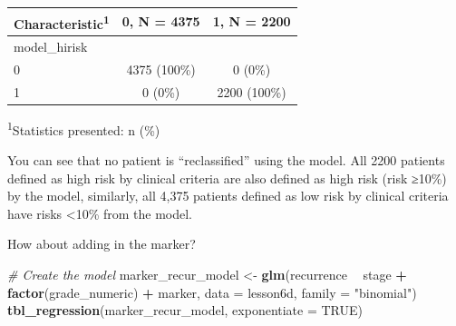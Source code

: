 \documentclass[]{book}
\newenvironment{Shaded}{\begin{snugshade}}{\end{snugshade}}
\newcommand{\CommentTok}[1]{\textcolor[rgb]{0.56,0.35,0.01}{\textit{#1}}}
\newcommand{\DataTypeTok}[1]{\textcolor[rgb]{0.13,0.29,0.53}{#1}}
\newcommand{\DecValTok}[1]{\textcolor[rgb]{0.00,0.00,0.81}{#1}}
\newcommand{\FloatTok}[1]{\textcolor[rgb]{0.00,0.00,0.81}{#1}}
\newcommand{\KeywordTok}[1]{\textcolor[rgb]{0.13,0.29,0.53}{\textbf{#1}}}
\newcommand{\NormalTok}[1]{#1}
\newcommand{\OperatorTok}[1]{\textcolor[rgb]{0.81,0.36,0.00}{\textbf{#1}}}
\newcommand{\OtherTok}[1]{\textcolor[rgb]{0.56,0.35,0.01}{#1}}
\newcommand{\StringTok}[1]{\textcolor[rgb]{0.31,0.60,0.02}{#1}}
\begin{document}
\begin{Shaded}
\end{Shaded}

\captionsetup[table]{labelformat=empty,skip=1pt}
\begin{longtable}{lcc}
\toprule
\textbf{Characteristic}\textsuperscript{1} & \textbf{0}, N = 4375 & \textbf{1}, N = 2200 \\ 
\midrule
model\_hirisk &  &  \\ 
0 & 4375 (100\%) & 0 (0\%) \\ 
1 & 0 (0\%) & 2200 (100\%) \\ 
\bottomrule
\end{longtable}
\vspace{-5mm}
\begin{minipage}{\linewidth}
\textsuperscript{1}Statistics presented: n (\%) \\ 
\end{minipage}

You can see that no patient is ``reclassified'' using the model. All
2200 patients defined as high risk by clinical criteria are also defined
as high risk (risk ≥10\%) by the model, similarly, all 4,375 patients
defined as low risk by clinical criteria have risks \textless10\% from
the model.

How about adding in the marker?

\begin{Shaded}
\begin{Highlighting}[]
\CommentTok{# Create the model}
\NormalTok{marker_recur_model <-}\StringTok{ }\KeywordTok{glm}\NormalTok{(recurrence }\OperatorTok{~}\StringTok{ }\NormalTok{stage }\OperatorTok{+}\StringTok{ }\KeywordTok{factor}\NormalTok{(grade_numeric) }\OperatorTok{+}\StringTok{ }\NormalTok{marker,}
                          \DataTypeTok{data =}\NormalTok{ lesson6d,}
                          \DataTypeTok{family =} \StringTok{"binomial"}\NormalTok{)}
\KeywordTok{tbl_regression}\NormalTok{(marker_recur_model, }\DataTypeTok{exponentiate =} \OtherTok{TRUE}\NormalTok{)}
\end{Highlighting}
\end{Shaded}
\end{document}
